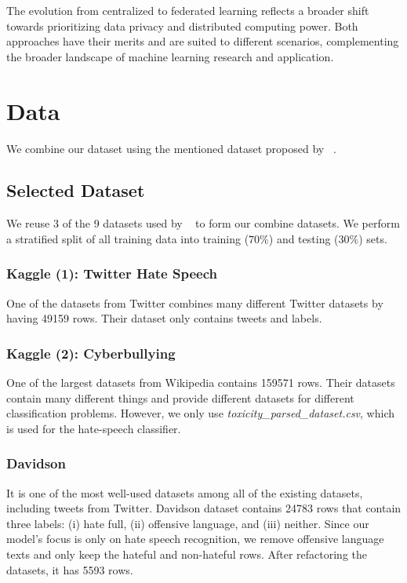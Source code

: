 \documentclass[11pt]{article}
\begin{document}
The evolution from centralized to federated learning reflects a broader shift towards prioritizing data privacy and distributed computing power. Both approaches have their merits and are suited to different scenarios, complementing the broader landscape of machine learning research and application.

\section{Data}
\label{sec:dataset}
We combine our dataset using the mentioned dataset proposed by ~\cite{FORTUNA2021102524}. 

\subsection{Selected Dataset} We reuse 3 of the 9 datasets used by ~\cite{FORTUNA2021102524} to form our combine datasets. We perform a stratified split of all training data into training ($70\%$) and testing ($30\%$) sets.
\subsubsection{Kaggle (1): Twitter Hate Speech ~\cite{agarwal2024twitter}}
One of the datasets from Twitter combines many different Twitter datasets by having 49159 rows. Their dataset only contains tweets and labels.

\subsubsection{Kaggle (2): Cyberbullying ~\cite{elsafoury2020cyberbullying}}
One of the largest datasets from Wikipedia contains 159571 rows. Their datasets contain many different things and provide different datasets for different classification problems. However, we only use \textit{toxicity\_parsed\_dataset.csv}, which is used for the hate-speech classifier.

\subsubsection{Davidson ~\cite{davidson2017automated}} 
\label{sec:davidson}
It is one of the most well-used datasets among all of the existing datasets, including tweets from Twitter. Davidson dataset contains 24783 rows that contain three labels: (i) hate full, (ii) offensive language, and (iii) neither. Since our model's focus is only on hate speech recognition, we remove offensive language texts and only keep the hateful and non-hateful rows. After refactoring the datasets, it has 5593 rows. 
\end{document}
